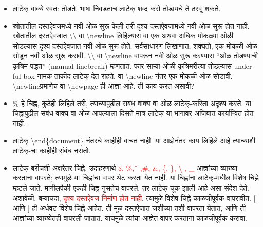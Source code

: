 \documentclass[11pt]{article}
\newcommand{\7}{\textbackslash}
\newcommand{\Syn}{\textenglish}
\begin{document}
\begin{itemize}[leftmargin=*]
\item लाटेक् वाक्ये स्वत: तोडते. भाषा निवडताच लाटेक् शब्द कसे तोडायचे ते ठरवू शकते.
 
\item स्रोतातील दस्तऐवजमध्ये नवी ओळ सुरू केली तरी दृश्य दस्तऐवजामध्ये नवी ओळ सुरू होत नाही.
स्रोतातील दस्तऐवजात \7\7 वा \Syn{\7newline} लिहिल्यास वा एक अथवा अधिक मोकळ्या ओळी सोडल्यास दृश्य दस्तऐवजात नवी ओळ सुरू होते. सर्वसाधारण लिखाणात, शक्यतो, एक मोकळी ओळ सोडून नवी
ओळ सुरू करावी. \7\7 वा \Syn{\7newline} वापरून नवी ओळ सुरू करण्यास ``ओळ तोडण्याची कृत्रिम पद्धत''
(\Syn{manual linebreak}) म्हणतात. फार साऱ्या ओळी कृत्रिमरीत्या तोडल्यास \Syn{underful
 box} नामक ताकीद लाटेक् देत राहते. वा \Syn{\7newline} नंतर एक मोकळी ओळ सोडावी. \Syn{\7newline}प्रमाणेच वा \Syn{\7newpage} ही आज्ञा आहे. ती काय करत असावी?

\item \Syn{\%} हे चिह्न, कुठेही लिहिले तरी, त्याच्यापुढील सबंध वाक्य वा ओळ लाटेक्-करिता
अदृश्य करते. या चिह्नापुढील सबंध वाक्य वा ओळ आपल्याला दिसते मात्र लाटेक् या भागावर
अजिबात कार्यान्वित होत नाही. 

\item लाटेक् \Syn{\7end\{document\}} नंतरचे काहीही वाचत नाही. या आज्ञेनंतर काय
 लिहिले आहे त्याच्याशी लाटेक्-चा काहीही संबंध नसतो.
 
\item लाटेक् बरीचशी अक्षरेतर चिह्ने, उदाहरणार्थ \textcolor{red}{\Syn{\$, \%, \^\,
 ,\#, \&, \{, \}, \7 , \_}} आज्ञांच्या व्याख्या करताना वापरते; त्यामुळे या
चिह्नांचा वापर थेट करता येत नाही. या चिह्नांना लाटेक्-मधील विशेष चिह्ने म्हटले
जाते. मागीलपैकी एकही चिह्न नुसतेच वापरले, तर लाटेक् चूक झाली आहे असा संदेश
देते. अशावेळी, बऱ्याचदा, \textcolor{red}{दृश्य दस्तऐवज निर्माण होत
 नाही}. त्यामुळे विशेष चिह्ने काळजीपूर्वक वापरावीत. \Syn{[} आणि \Syn{]} ही
अर्धवट विशेष चिह्ने आहेत. ती मूळ दस्तऐजात जशीच्या तशी वापरता येतात, आणि ती
आज्ञांच्या व्याख्येतही वापरली जातात. याचमुळे त्यांचा आज्ञेत वापर करताना काळजीपूर्वक
करावा.
 

\end{itemize}
\end{document}
